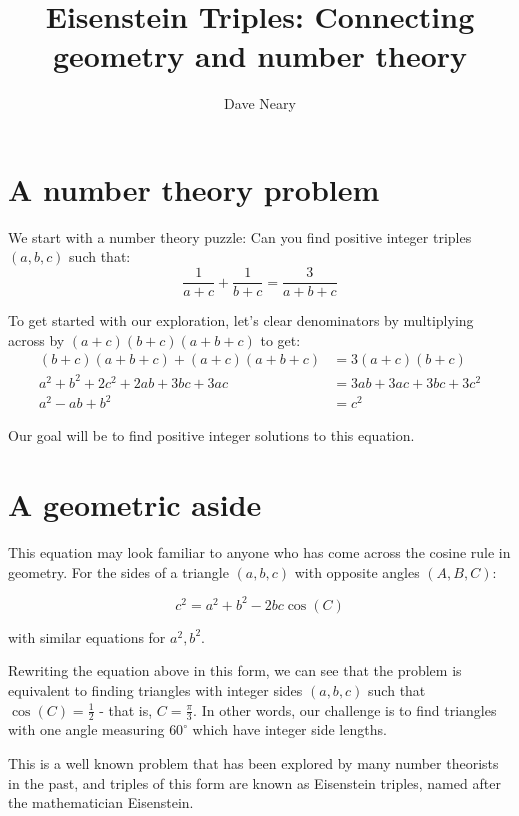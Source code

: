 \documentclass{article}
\begin{document}
\title{Eisenstein Triples: Connecting geometry and number theory}
\author{Dave Neary}

\maketitle

\section{A number theory problem}

We start with a number theory puzzle: Can you find positive integer triples $(a,b,c)$ such that:
\[ \frac{1}{a+c} + \frac{1}{b+c} = \frac{3}{a+b+c} \]

To get started with our exploration, let's clear denominators by multiplying across by
$(a+c)(b+c)(a+b+c)$ to get:
\begin{equation*}
\begin{split}
(b+c)(a+b+c) + (a+c)(a+b+c) & = 3(a+c)(b+c) \\
a^2 + b^2 + 2c^2 + 2ab + 3bc + 3ac & = 3ab + 3ac + 3bc + 3c^2 \\
a^2 - ab + b^2 &= c^2
\end{split}
\end{equation*}

Our goal will be to find positive integer solutions to this equation.

\section{A geometric aside}

This equation may look familiar to anyone who has come across the cosine rule in geometry.
For the sides of a triangle $(a,b,c)$ with opposite angles $(A,B,C)$:

\[ c^2 = a^2 + b^2 -2bc\cos(C) \]

with similar equations for $a^2, b^2$.

Rewriting the equation above in this form, we can see that the problem is equivalent to finding
triangles with integer sides $(a,b,c)$ such that $\cos(C) = \frac{1}{2}$ - that is,
$C = \frac{\pi}{3}$. In other words, our challenge is to find triangles with one angle measuring
$60^{\circ}$ which have integer side lengths.

This is a well known problem that has been explored by many number theorists in the past, and
triples of this form are known as Eisenstein triples, named after the mathematician Eisenstein.
\end{document}
